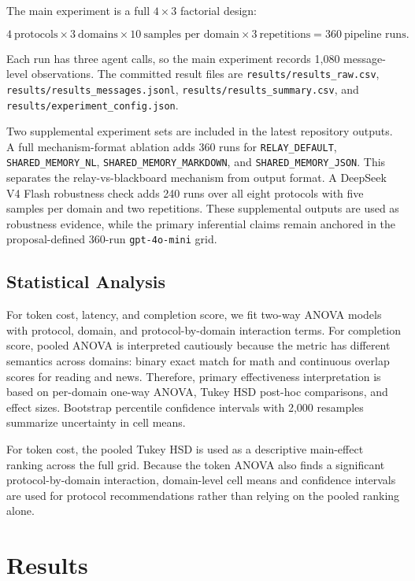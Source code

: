 \documentclass[11pt]{article}
\newcommand{\RD}{\texttt{RELAY\_DEFAULT}\xspace}
\newcommand{\SMJ}{\texttt{SHARED\_MEMORY\_JSON}\xspace}
\newcommand{\SMN}{\texttt{SHARED\_MEMORY\_NL}\xspace}
\newcommand{\SMM}{\texttt{SHARED\_MEMORY\_MARKDOWN}\xspace}
\begin{document}
The main experiment is a full $4 \times 3$ factorial design:

\[
4\ \text{protocols} \times 3\ \text{domains} \times 10\ \text{samples per domain} \times 3\ \text{repetitions} = 360\ \text{pipeline runs}.
\]

Each run has three agent calls, so the main experiment records 1,080 message-level observations. The committed result files are \texttt{results/results\_raw.csv}, \texttt{results/results\_messages.jsonl}, \texttt{results/results\_summary.csv}, and \texttt{results/experiment\_config.json}.

Two supplemental experiment sets are included in the latest repository outputs. A full mechanism-format ablation adds 360 runs for \RD, \SMN, \SMM, and \SMJ. This separates the relay-vs-blackboard mechanism from output format. A DeepSeek V4 Flash robustness check adds 240 runs over all eight protocols with five samples per domain and two repetitions. These supplemental outputs are used as robustness evidence, while the primary inferential claims remain anchored in the proposal-defined 360-run \texttt{gpt-4o-mini} grid.

\subsection{Statistical Analysis}

For token cost, latency, and completion score, we fit two-way ANOVA models with protocol, domain, and protocol-by-domain interaction terms. For completion score, pooled ANOVA is interpreted cautiously because the metric has different semantics across domains: binary exact match for math and continuous overlap scores for reading and news. Therefore, primary effectiveness interpretation is based on per-domain one-way ANOVA, Tukey HSD post-hoc comparisons, and effect sizes. Bootstrap percentile confidence intervals with 2,000 resamples summarize uncertainty in cell means.

For token cost, the pooled Tukey HSD is used as a descriptive main-effect ranking across the full grid. Because the token ANOVA also finds a significant protocol-by-domain interaction, domain-level cell means and confidence intervals are used for protocol recommendations rather than relying on the pooled ranking alone.

\section{Results}
\end{document}
